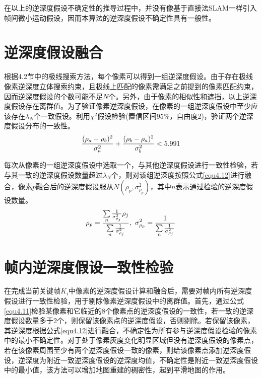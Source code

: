 在以上的逆深度假设不确定性的推导过程中，并没有像基于直接法SLAM一样引入帧间微小运动假设，因而本算法的逆深度假设不确定性具有一般性。


\section{逆深度假设融合}
根据4.2节中的极线搜索方法，每个像素可以得到一组逆深度假设。由于存在极线像素逆深度立体搜索约束，且极线上匹配的像素需满足之前提到的像素匹配约束，因而逆深度假设的个数可能不足$N$个。另外，由于像素的相似性和遮挡，以上逆深度假设存在离群值。为了验证像素逆深度假设，在像素的一组逆深度假设中至少应该存在$\lambda_N$个一致假设。利用$\chi^2$假设检验(置信区间$95\%$，自由度2)，验证两个逆深度假设分布的一致性。
\begin{equation}
\label{equ4.11}
{ (\rho_a - \rho_b)^2 \over \sigma_a^2 }+{ (\rho_b - \rho_a)^2 \over \sigma_b^2} < 5.991
\end{equation}

每次从像素的一组逆深度假设中选取一个，与其他逆深度假设进行一致性检验，若与其一致的逆深度假设数量超过$\lambda_N$个，则对该组逆深度按照公式\eqref{equ4.12}进行融合\upcite{[4.3]}，像素$p$融合后的逆深度假设服从$N(\rho_p,\sigma_{\rho_p}^2)$，其中$n$表示通过检验的逆深度假设数量。
\begin{equation}
\label{equ4.12}
\rho_p = { {\sum\limits_n {1 \over \sigma_{\rho_j}^2} \rho_j } \over \sum\limits_n {1 \over \sigma_{\rho_j}^2}  }, \ 
\sigma_{\rho_p}^2 = {1 \over  \sum\limits_n { 1 \over \sigma_{\rho_j}^2}  }
\end{equation}


\section{帧内逆深度假设一致性检验}
在完成当前关键帧$K_i$中像素的逆深度假设计算和融合后，需要对帧内所有逆深度假设进行一致性检验，用于剔除像素逆深度假设中的离群值。首先，通过公式\eqref{equ4.11}检验某像素和它临近的8个像素点的逆深度假设的一致性，若一致的逆深度假设数量多于2个，则保留该像素点的逆深度假设，否则剔除。若保留该像素，其逆深度根据公式\eqref{equ4.12}进行融合，不确定性为所有参与逆深度假设检验的像素中的最小不确定性。对于处于像素灰度变化明显区域但没有逆深度假设的像素点，若在该像素周围至少有两个逆深度假设一致的像素，则给该像素点添加逆深度假设，逆深度为附近一致逆深度假设的逆深度均值，不确定性是附近一致逆深度假设中的最小值，该方法可以增加地图重建的稠密性，起到平滑地图的作用。

